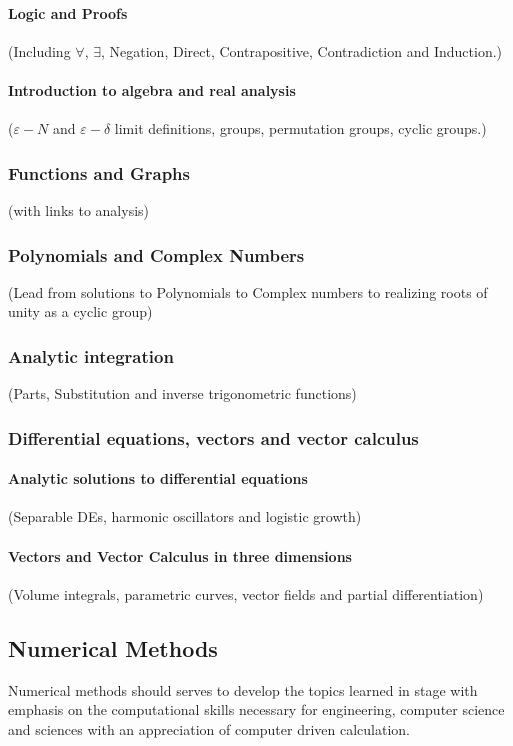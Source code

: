 \documentclass[12pt]{report}
\begin{document}
        \paragraph*{Logic and Proofs} (Including $\forall$, $\exists$, Negation, Direct, Contrapositive, Contradiction and Induction.)
        \paragraph*{Introduction to algebra and real analysis} ($\varepsilon - N$ and $\varepsilon - \delta$ limit definitions, groups, permutation groups, cyclic groups.)
    \subsubsection{Functions and Graphs} (with links to analysis)
    \subsubsection{Polynomials and Complex Numbers} (Lead from solutions to Polynomials to Complex numbers to realizing roots of unity as a cyclic group)
    \subsubsection{Analytic integration} (Parts, Substitution and inverse trigonometric functions)
    \subsubsection{Differential equations, vectors and vector calculus}
        \paragraph*{Analytic solutions to differential equations} (Separable DEs, harmonic oscillators and logistic growth)
        \paragraph*{Vectors and Vector Calculus in three dimensions} (Volume integrals, parametric curves, vector fields and partial differentiation)



\subsection{Numerical Methods}
    Numerical methods should serves to develop the topics learned in stage with emphasis on the computational skills necessary for engineering, computer science and sciences with an appreciation of computer driven calculation.
\end{document}
